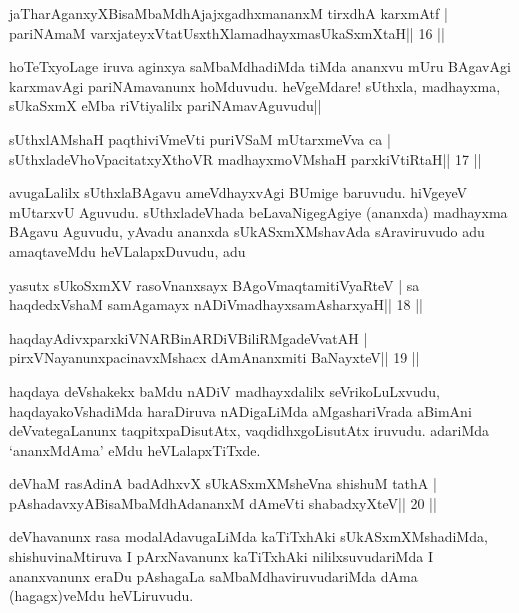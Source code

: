\begin{shl}
jaTharAganxyXBisaMbaMdhAjajxgadhxmananxM tirxdhA karxmAtf |
pariNAmaM varxjateyxVtatUsxthXlamadhayxmasUkaSxmXtaH\hfill || 16 ||
\end{shl}

\begin{artha}
hoTeTxyoLage iruva aginxya saMbaMdhadiMda tiMda ananxvu mUru BAgavAgi
karxmavAgi pariNAmavanunx hoMduvudu. heVgeMdare! sUthxla, madhayxma,
sUkaSxmX eMba riVtiyalilx pariNAmavAguvudu|| 
\end{artha}

\begin{shl}
sUthxlAMshaH paqthiviVmeVti puriVSaM mUtarxmeVva ca |
sUthxladeVhoVpacitatxyXthoVR madhayxmoVM\s shaH parxkiVtiRtaH\hfill || 17 ||
\end{shl}

\begin{artha}
avugaLalilx sUthxlaBAgavu ameVdhayxvAgi BUmige baruvudu. hiVgeyeV mUtarxvU
Aguvudu. sUthxladeVhada beLavaNigegAgiye (ananxda) madhayxma BAgavu
Aguvudu, yAvadu ananxda sUkASxmXMshavAda sAraviruvudo adu amaqtaveMdu
heVLalapxDuvudu, adu 
\end{artha}

\begin{shl}
yasutx sUkoSxmXV rasoV\s nanxsayx BAgoV\s maqtamitiVyaRteV |
sa haqdedxVshaM samAgamayx nADiVmadhayxsamAsharxyaH\hfill || 18 ||
\end{shl}

\begin{shl}
haqdayAdivxparxkiVNARBinARDiVBiliRMgadeVvatAH |
pirxVNayanunxpacinavxMshacx dAmAnanxmiti BaNayxteV\hfill || 19 ||
\end{shl}

\begin{artha}
haqdaya deVshakekx baMdu nADiV madhayxdalilx seVrikoLuLxvudu, haqdayakoVshadiMda haraDiruva nADigaLiMda aMgashariVrada aBimAni deVvategaLanunx taqpitxpaDisutAtx, vaqdidhxgoLisutAtx iruvudu. adariMda `ananxMdAma' eMdu heVLalapxTiTxde.
\end{artha}

\begin{shl}
deVhaM rasAdinA badAdhxvX sUkASxmXMsheVna shishuM tathA |
pAshadavxyABisaMbaMdhAdananxM dAmeVti shabadxyXteV\hfill || 20 ||
\end{shl}

\begin{artha}
deVhavanunx rasa modalAdavugaLiMda kaTiTxhAki sUkASxmXMshadiMda, shishuvinaMtiruva I pArxNavanunx kaTiTxhAki nililxsuvudariMda I ananxvanunx eraDu pAshagaLa saMbaMdhaviruvudariMda dAma (hagagx)veMdu heVLiruvudu.
\end{artha}

